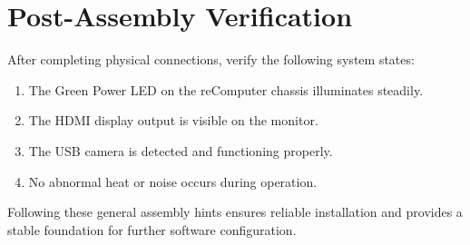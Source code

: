 \section{Post-Assembly Verification}
After completing physical connections, verify the following system states:
\begin{enumerate}
	\item The Green Power LED on the reComputer chassis illuminates steadily.
	\item The HDMI display output is visible on the monitor.
	\item The USB camera is detected and functioning properly.
	\item No abnormal heat or noise occurs during operation.
\end{enumerate}

\vspace{0.4cm}
\noindent
Following these general assembly hints ensures reliable installation and provides a stable foundation for further software configuration.